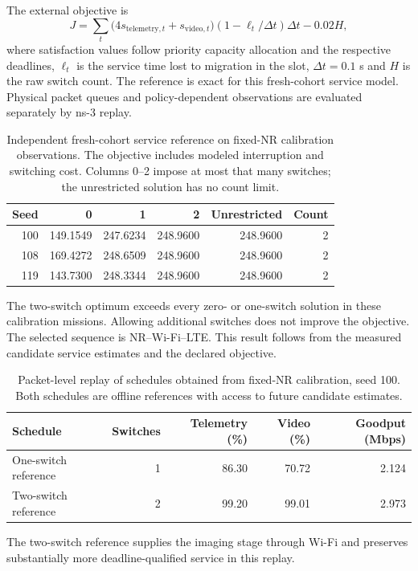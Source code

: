 \documentclass[preprint,12pt]{elsarticle}
\begin{document}
The external objective is
\begin{equation}
J=\sum_t \bigl(4s_{\mathrm{telemetry},t}+s_{\mathrm{video},t}\bigr)
(1-\ell_t/\Delta t)\Delta t-0.02H,
\end{equation}
where satisfaction values follow priority capacity allocation and the respective deadlines, $\ell_t$ is the service time lost to migration in the slot, $\Delta t=0.1$ s and $H$ is the raw switch count. The reference is exact for this fresh-cohort service model. Physical packet queues and policy-dependent observations are evaluated separately by ns-3 replay.
\begin{table}[ht]\centering\small
\caption{Independent fresh-cohort service reference on fixed-NR calibration observations. The objective includes modeled interruption and switching cost. Columns 0--2 impose at most that many switches; the unrestricted solution has no count limit.}
\label{tab:reference}
\begin{tabular}{rrrrrr}\hline
Seed & 0 & 1 & 2 & Unrestricted & Count \\ \hline
100 & 149.1549 & 247.6234 & 248.9600 & 248.9600 & 2 \\
108 & 169.4272 & 248.6509 & 248.9600 & 248.9600 & 2 \\
119 & 143.7300 & 248.3344 & 248.9600 & 248.9600 & 2 \\
\hline\end{tabular}\end{table}
The two-switch optimum exceeds every zero- or one-switch solution in these calibration missions. Allowing additional switches does not improve the objective. The selected sequence is NR--Wi-Fi--LTE. This result follows from the measured candidate service estimates and the declared objective.

\begin{table}[ht]\centering\small
\caption{Packet-level replay of schedules obtained from fixed-NR calibration, seed 100. Both schedules are offline references with access to future candidate estimates.}
\label{tab:packet_reference}
\setlength{\tabcolsep}{4pt}
\begin{tabular}{lrrrr}\hline
Schedule & Switches & Telemetry (\%) & Video (\%) & Goodput (Mbps) \\ \hline
One-switch reference & 1 & 86.30 & 70.72 & 2.124 \\
Two-switch reference & 2 & 99.20 & 99.01 & 2.973 \\
\hline\end{tabular}\end{table}
The two-switch reference supplies the imaging stage through Wi-Fi and preserves substantially more deadline-qualified service in this replay.
\end{document}
